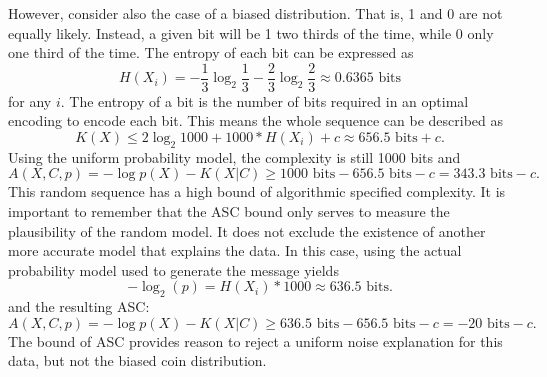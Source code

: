 However, consider also the case of a biased distribution.
That is, 1 and 0 are not equally likely.
Instead, a given bit will be 1 two thirds of the time, while 0 only one third of the time.
The entropy of each bit can be expressed as
\begin{equation}
    H(X_i) = - \frac{1}{3} \log_2 \frac{1}{3} - \frac{2}{3} \log_2 \frac{2}{3} \approx 0.6365 \mbox{ bits}
\end{equation} for any $i$.
The entropy of a bit is the number of bits required in an optimal encoding to encode each bit.
This means the whole sequence can be described as
\begin{equation}
    K(X) \leq 2 \log_2 1000 + 1000*H(X_i) + c \approx 656.5 \mbox{ bits} +c \mbox{.}
\end{equation}
Using the uniform probability model, the complexity is still 1000 bits and
\begin{equation}
    A(X,C,p) = - \log p(X) - K(X|C) \geq 1000 \mbox{ bits} - 656.5 \mbox{ bits} - c = 343.3 \mbox{ bits} -c \mbox{.}
\end{equation}
This random sequence has a high bound of algorithmic specified complexity.
It is important to remember that the ASC bound only serves to measure the plausibility of the random model.
It does not exclude the existence of another more accurate model that explains the data.
In this case, using the actual probability model used to generate the message yields
\begin{equation}
    -\log_2(p) = H(X_i) * 1000 \approx 636.5 \mbox{ bits.}
\end{equation}
and the resulting ASC:
\begin{equation}
    A(X,C,p) = - \log p(X) - K(X|C) \geq 636.5 \mbox{ bits} - 656.5 \mbox{ bits} - c = -20 \mbox{ bits} -c \mbox{.}
\end{equation}
The bound of ASC provides reason to reject a uniform noise explanation for this data, but not the biased coin distribution.

